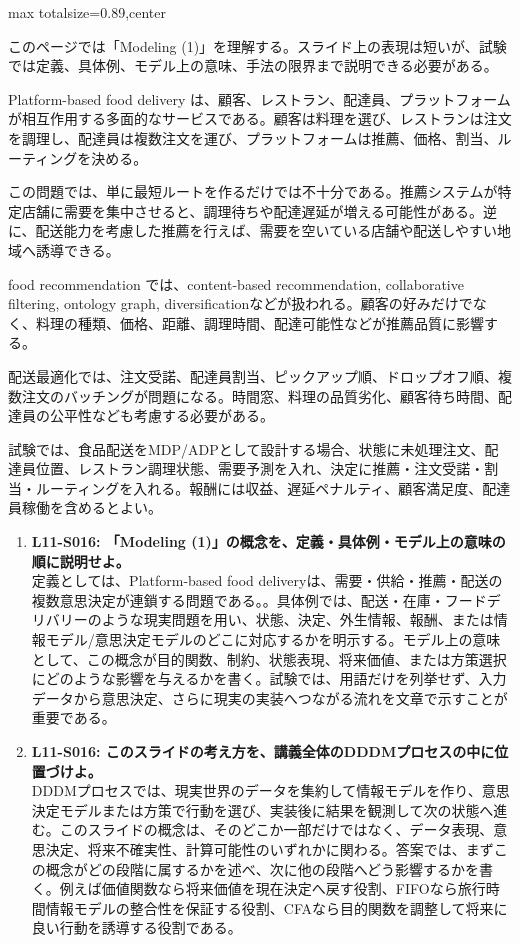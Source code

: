 \begin{minipage}[t]{0.58\textwidth}
\begin{adjustbox}{max totalsize={\textwidth}{0.89\textheight},center}
\begin{minipage}{\textwidth}\scriptsize
{}このページでは「Modeling (1)」を理解する。スライド上の表現は短いが、試験では定義、具体例、モデル上の意味、手法の限界まで説明できる必要がある。\par
Platform-based food delivery は、顧客、レストラン、配達員、プラットフォームが相互作用する多面的なサービスである。顧客は料理を選び、レストランは注文を調理し、配達員は複数注文を運び、プラットフォームは推薦、価格、割当、ルーティングを決める。\par
この問題では、単に最短ルートを作るだけでは不十分である。推薦システムが特定店舗に需要を集中させると、調理待ちや配達遅延が増える可能性がある。逆に、配送能力を考慮した推薦を行えば、需要を空いている店舗や配送しやすい地域へ誘導できる。\par
food recommendation では、content-based recommendation, collaborative filtering, ontology graph, diversificationなどが扱われる。顧客の好みだけでなく、料理の種類、価格、距離、調理時間、配達可能性などが推薦品質に影響する。\par
配送最適化では、注文受諾、配達員割当、ピックアップ順、ドロップオフ順、複数注文のバッチングが問題になる。時間窓、料理の品質劣化、顧客待ち時間、配達員の公平性なども考慮する必要がある。\par
試験では、食品配送をMDP/ADPとして設計する場合、状態に未処理注文、配達員位置、レストラン調理状態、需要予測を入れ、決定に推薦・注文受諾・割当・ルーティングを入れる。報酬には収益、遅延ペナルティ、顧客満足度、配達員稼働を含めるとよい。\par{}\begin{enumerate}\item \textbf{L11-S016: 「Modeling (1)」の概念を、定義・具体例・モデル上の意味の順に説明せよ。}\\定義としては、Platform-based food deliveryは、需要・供給・推薦・配送の複数意思決定が連鎖する問題である。。具体例では、配送・在庫・フードデリバリーのような現実問題を用い、状態、決定、外生情報、報酬、または情報モデル/意思決定モデルのどこに対応するかを明示する。モデル上の意味として、この概念が目的関数、制約、状態表現、将来価値、または方策選択にどのような影響を与えるかを書く。試験では、用語だけを列挙せず、入力データから意思決定、さらに現実の実装へつながる流れを文章で示すことが重要である。\item \textbf{L11-S016: このスライドの考え方を、講義全体のDDDMプロセスの中に位置づけよ。}\\DDDMプロセスでは、現実世界のデータを集約して情報モデルを作り、意思決定モデルまたは方策で行動を選び、実装後に結果を観測して次の状態へ進む。このスライドの概念は、そのどこか一部だけではなく、データ表現、意思決定、将来不確実性、計算可能性のいずれかに関わる。答案では、まずこの概念がどの段階に属するかを述べ、次に他の段階へどう影響するかを書く。例えば価値関数なら将来価値を現在決定へ戻す役割、FIFOなら旅行時間情報モデルの整合性を保証する役割、CFAなら目的関数を調整して将来に良い行動を誘導する役割である。\end{enumerate}

\end{minipage}
\end{adjustbox}
\end{minipage}
